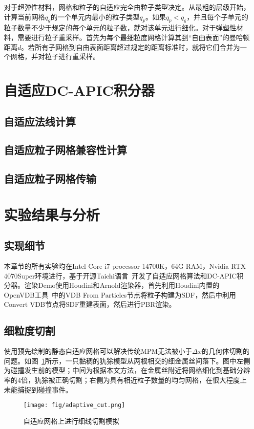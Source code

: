 对于超弹性材料，网格和粒子的自适应完全由粒子类型决定。从最粗的层级开始，计算当前网格\(q_g\)的一个单元内最小的粒子类型\(q_p\)。如果\(q_p < q_g\)，并且每个子单元的粒子数量不少于规定的每个单元的粒子数，就对该单元进行细化。对于弹塑性材料，需要进行粒子重采样。首先为每个最细粒度网格计算其到“自由表面”的曼哈顿距离\(d\)。若所有子网格到自由表面距离超过规定的距离标准时，就将它们合并为一个网格，并对粒子进行重采样。

\section{自适应DC-APIC积分器}
\subsection{自适应法线计算}
\subsection{自适应粒子网格兼容性计算}
\subsection{自适应粒子网格传输}

\section{实验结果与分析}
\subsection{实现细节}
本章节的所有实验均在Intel Core i7 processor 14700K，64G RAM，Nvidia RTX 4070Super环境进行，基于开源Taichi语言~\cite{hu2018moving}开发了自适应网格算法和DC-APIC积分器。渲染Demo使用Houdini和Arnold渲染器，首先利用Houdini内置的OpenVDB工具~\cite{museth2013vdb}中的VDB From Particles节点将粒子构建为SDF，然后中利用Convert VDB节点将SDF重建表面，然后进行PBR渲染。

\subsection{细粒度切割}
使用预先绘制的静态自适应网格可以解决传统MPM无法被小于$\Delta x$的几何体切割的问题。如图~\ref{fig:adaptive_cut}所示，一只黏稠的犰狳模型从两根相交的细金属丝间落下。图中左侧为碰撞发生前的模型；中间为根据本文方法，在金属丝附近将网格细化到基础分辨率的4倍，犰狳被正确切割；右侧为具有相近粒子数量的均匀网格，在很大程度上未能捕捉到碰撞事件。
\begin{figure}[H]
    \centering
    \texttt{[image: fig/adaptive\_cut.png]}
    \caption{自适应网格上进行细线切割模拟}
    \label{fig:adaptive_cut}
\end{figure}

